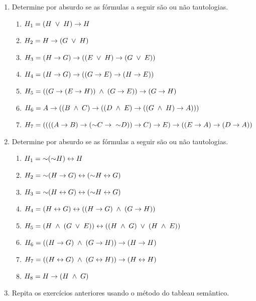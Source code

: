 
\begin{enumerate}
  \item Determine por absurdo se as fórmulas a seguir são ou não tautologias.
    \begin{enumerate}
      \item $H_1 = (H \;\lor\;  H) \rightarrow H$
      \item $H_2 =  H \rightarrow (G \;\lor\; H)$
      \item $H_3 = (H \rightarrow G) \rightarrow ( (E \;\lor\;  H) \rightarrow (G \;\lor\;  E) )$
      \item $H_4 = (H \rightarrow G) \rightarrow ( (G \rightarrow E) \rightarrow (H \rightarrow E) )$
      \item $H_5 = ( (G \rightarrow (E \rightarrow H)) \;\land\; (G \rightarrow E) ) \rightarrow (G \rightarrow H)$
      \item $H_6 = A \rightarrow ((B \;\land\; C) \rightarrow ((D \;\land\; E) \rightarrow ((G \;\land\; H) \rightarrow A )))$
      \item $H_7 = ((((A \rightarrow B) \rightarrow (\mathord{\sim} C \rightarrow \; \mathord{\sim} D)) \rightarrow C) \rightarrow E) \rightarrow \\ ((E \rightarrow A) \rightarrow (D \rightarrow A))$
    \end{enumerate}
  \item Determine por absurdo se as fórmulas a seguir são ou não tautologias.
    \begin{enumerate}
      \item $H_1 = \mathord{\sim}(\mathord{\sim} H) \leftrightarrow H$
      \item $H_2 = \mathord{\sim}(H \rightarrow G) \leftrightarrow (\mathord{\sim} H \leftrightarrow G)$
      \item $H_3 = \mathord{\sim}(H \leftrightarrow G) \leftrightarrow (\mathord{\sim} H \leftrightarrow G)$
      \item $H_4 = (H \leftrightarrow G) \leftrightarrow ((H \rightarrow G) \;\land\; (G \rightarrow H))$
      \item $H_5 = (H \;\land\; (G \;\lor\; E)) \leftrightarrow ((H \;\land\; G) \;\lor\; (H \;\land\; E))$
      \item $H_6 = ( (H \rightarrow G) \;\land\; (G \rightarrow H) ) \rightarrow (H \rightarrow H)$
      \item $H_7 = ( (H \leftrightarrow G) \;\land\; (G \leftrightarrow H) ) \rightarrow (H \leftrightarrow H)$
      \item $H_8 = H \rightarrow (H \;\land\; G)$
    \end{enumerate}
  \item Repita os exercícios anteriores usando o método do tableau semântico.
\end{enumerate}
